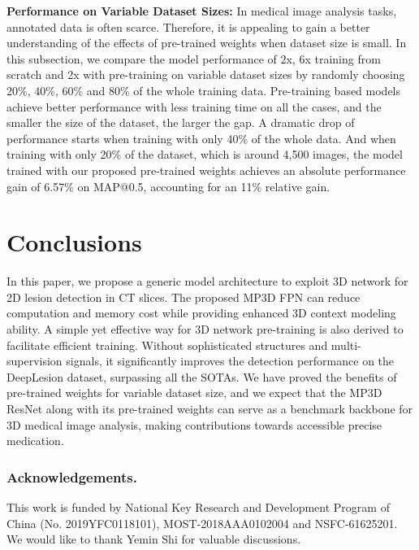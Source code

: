 \documentclass[runningheads]{llncs}
\begin{document}
\noindent\textbf{Performance on Variable Dataset Sizes:} In medical image analysis tasks, annotated data is often scarce. Therefore, it is appealing to gain a better understanding of the effects of pre-trained weights when dataset size is small. In this subsection, we compare the model performance of 2x, 6x training from scratch and 2x with pre-training on variable dataset sizes by randomly choosing 20\%, 40\%, 60\% and 80\% of the whole training data. Pre-training based models achieve better performance with less training time on all the cases, and the smaller the size of the dataset, the larger the gap. A dramatic drop of performance starts when training with only 40\% of the whole data. And when training with only 20\% of the dataset, which is around 4,500 images, the model trained with our proposed pre-trained weights achieves an absolute performance gain of 6.57\% on MAP@0.5, accounting for an 11\% relative gain. 



\section{Conclusions}

In this paper, we propose a generic model architecture to exploit 3D network for 2D lesion detection in CT slices. 
The proposed MP3D FPN can reduce computation and memory cost while providing enhanced 3D context modeling ability. 
A simple yet effective way for 3D network pre-training is also derived to facilitate efficient training. 
Without sophisticated structures and multi-supervision signals, it significantly improves the detection performance on the DeepLesion dataset, surpassing all the SOTAs. 
We have proved the benefits of pre-trained weights for variable dataset size, and we expect that the MP3D ResNet along with its pre-trained weights can serve as a benchmark backbone for 3D medical image analysis, making contributions towards accessible precise medication. 



\subsubsection{Acknowledgements.} This work is funded by National Key Research and Development Program of China (No. 2019YFC0118101), MOST-2018AAA0102004 and NSFC-61625201. We would like to thank Yemin Shi for valuable discussions.
\end{document}
